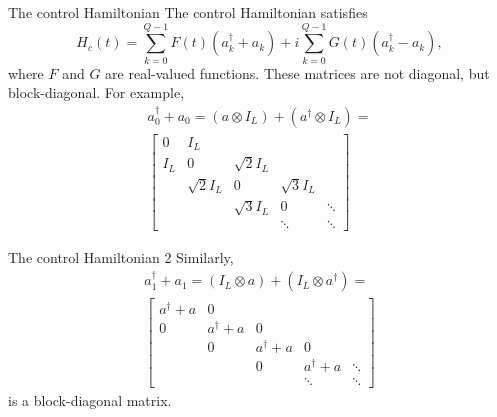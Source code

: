 \documentclass{beamer}
\begin{document}
\begin{frame}{The control Hamiltonian}
  The control Hamiltonian satisfies
  \[
  H_c(t) = \sum_{k=0}^{Q-1} F(t)\left( a^\dag_k + a_k \right) +  i \sum_{k=0}^{Q-1} G(t)\left( a^\dag_k - a_k \right),
  \]
  where $F$ and $G$ are real-valued functions. These matrices are not diagonal, but block-diagonal. For example,
  \begin{multline*}
    a^\dag_0 + a_0 = (a\otimes I_L) + (a^\dag\otimes I_L) =\\
    \begin{bmatrix}
    0 &  I_L &  &  & \\
    I_L  & 0 &  \sqrt{2}I_L &  & \\
      &  \sqrt{2}I_L  & 0 & \sqrt{3}I_L & \\
      &   &   \sqrt{3}I_L & 0 & \ddots \\
      &   &  & \ddots & \ddots
    \end{bmatrix}
  \end{multline*}
\end{frame}

\begin{frame}{The control Hamiltonian 2}
  Similarly,
  \begin{multline*}
    a^\dag_1 + a_1 = (I_L\otimes a) + (I_L \otimes a^\dag) =\\
    \begin{bmatrix}
    a^\dag + a & 0 &  &  & \\
    0  & a^\dag + a &  0 &  & \\
      &  0 & a^\dag + a & 0 & \\
      &   &   0 & a^\dag + a & \ddots \\
      &   &  & \ddots & \ddots
    \end{bmatrix}
  \end{multline*}
  is a block-diagonal matrix.
\end{frame}
\end{document}
